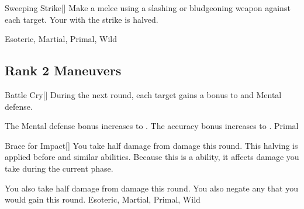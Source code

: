 \lowercase{\hypertarget{maneuver:Sweeping Strike}{}}\label{maneuver:Sweeping Strike}
\hypertarget{maneuver:Sweeping Strike}{}
\begin{freeability}[Rank 1]{Sweeping Strike}[]
Make a melee  using a slashing or bludgeoning weapon against each target.
Your  with the strike is halved.


 Esoteric, Martial, Primal, Wild
\end{freeability}
\vspace{0.25em}


\subsection{Rank 2 Maneuvers}

\lowercase{\hypertarget{maneuver:Battle Cry}{}}\label{maneuver:Battle Cry}
\hypertarget{maneuver:Battle Cry}{}
\begin{freeability}[Rank 2]{Battle Cry}[]
During the next round, each target gains a  bonus to  and Mental defense.

\rankline
{} The Mental defense bonus increases to .
 The accuracy bonus increases to .
 Primal
\end{freeability}
\vspace{0.25em}



\lowercase{\hypertarget{maneuver:Brace for Impact}{}}\label{maneuver:Brace for Impact}
\hypertarget{maneuver:Brace for Impact}{}
\begin{freeability}[Rank 2]{Brace for Impact}[]
You take half damage from  damage this round.
This halving is applied before  and similar abilities.
Because this is a  ability, it affects damage you take during the current phase.

\rankline
{} You also take half damage from  damage this round.
 You also negate any  that you would gain this round.
 Esoteric, Martial, Primal, Wild
\end{freeability}
\vspace{0.25em}



